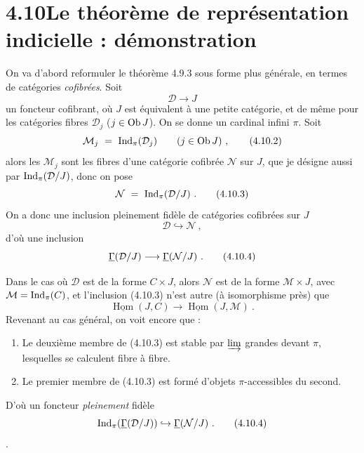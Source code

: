 \section*{4.10\quad Le théorème de représentation indicielle : démonstration}

On va d'abord reformuler le théorème 4.9.3 sous forme plus générale, en termes de catégories \textit{cofibrées}. Soit
\[
\mathcal{D} \longrightarrow J \tag*{(4.10.1)}
\]
un foncteur cofibrant, où $J$ est équivalent à une petite catégorie, et de même pour les catégories fibres $\mathcal{D}_j$ ($j \in \operatorname{Ob} J$). On se donne un cardinal infini $\pi$. Soit
\[
\mathcal{M}_j \ = \ \Ind_\pi(\mathcal{D}_j) \qquad (j \in \Ob J) \ , \tag*{(4.10.2)}
\]
alors les $\mathcal{M}_j$ sont les fibres d'une catégorie cofibrée $\mathcal{N}$ sur $J$, que je désigne aussi par $\mathrm{Ind}_\pi(\mathcal{D}/J)$, donc on pose
\[
\mathcal{N} \ = \ \Ind_\pi(\mathcal{D}/J) \ . \tag*{(4.10.3)}
\]
On a donc une inclusion pleinement fidèle de catégories cofibrées sur $J$
\[
\mathcal{D} \hookrightarrow \mathcal{N} \ ,
\]
d'où une inclusion
\[
\uGamma(\mathcal{D}/J) \longrightarrow \uGamma(\mathcal{N}/J) \ . \tag*{(4.10.4)}
\]

Dans le cas où $\mathcal{D}$ est de la forme $C \times J$, alors $\mathcal{N}$ est de la forme $\mathcal{M} \times J$, avec $\mathcal{M} = \mathrm{Ind}_\pi(C)$, et l'inclusion (4.10.3) n'est autre (à isomorphisme près) que
\[
\underline{\operatorname{Hom}}(J, C) \longrightarrow \underline{\operatorname{Hom}}(J, \mathcal{M}) \ .
\]
Revenant au cas général, on voit encore que :
\begin{enumerate}[label={}, leftmargin=3em]
\item[1°)] Le deuxième membre de (4.10.3) est stable par $\varinjlim$ grandes devant $\pi$, lesquelles se calculent fibre à fibre.
\item[2°)] Le premier membre de (4.10.3) est formé d'objets $\pi$-accessibles du second.
\end{enumerate}
D'où un foncteur \textit{pleinement} fidèle
\[
\Ind_\pi(\uGamma(\mathcal{D}/J)) \hookrightarrow \uGamma(\mathcal{N}/J) \ . \tag*{(4.10.4)}
\]
\setcounter{footnote}{103}%
.


